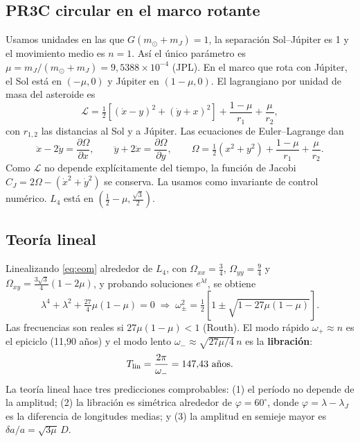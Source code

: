 \documentclass[11pt, a4paper]{article}
\newcommand{\Tlin}{T_{\rm lin}}
\begin{document}
\subsection{PR3C circular en el marco rotante}
Usamos unidades en las que $G(m_\odot+m_J)=1$, la separación Sol--Júpiter es 1 y el movimiento medio es $n=1$. Así el único parámetro es $\mu=m_J/(m_\odot+m_J)=9{,}5388\times10^{-4}$ (JPL). En el marco que rota con Júpiter, el Sol está en $(-\mu,0)$ y Júpiter en $(1-\mu,0)$. El lagrangiano por unidad de masa del asteroide es
\begin{equation}
\mathcal L=\tfrac12\left[(\dot x-y)^2+(\dot y+x)^2\right]+\frac{1-\mu}{r_1}+\frac{\mu}{r_2},
\end{equation}
con $r_{1,2}$ las distancias al Sol y a Júpiter. Las ecuaciones de Euler--Lagrange dan
\begin{equation}
\ddot x-2\dot y=\frac{\partial\Omega}{\partial x},\qquad \ddot y+2\dot x=\frac{\partial\Omega}{\partial y},\qquad
\Omega=\tfrac12(x^2+y^2)+\frac{1-\mu}{r_1}+\frac{\mu}{r_2}.
\label{eq:eom}
\end{equation}
Como $\mathcal L$ no depende explícitamente del tiempo, la función de Jacobi $C_J=2\Omega-(\dot x^2+\dot y^2)$ se conserva. La usamos como invariante de control numérico. $L_4$ está en $(\tfrac12-\mu,\tfrac{\sqrt3}{2})$.

\subsection{Teoría lineal}
Linealizando \eqref{eq:eom} alrededor de $L_4$, con $\Omega_{xx}=\tfrac34$, $\Omega_{yy}=\tfrac94$ y $\Omega_{xy}=\tfrac{3\sqrt3}{4}(1-2\mu)$, y probando soluciones $e^{\lambda t}$, se obtiene
\begin{equation}
\lambda^4+\lambda^2+\tfrac{27}{4}\mu(1-\mu)=0\;\Rightarrow\;
\omega_{\pm}^2=\tfrac12\left[1\pm\sqrt{1-27\mu(1-\mu)}\right].
\label{eq:car}
\end{equation}
Las frecuencias son reales si $27\mu(1-\mu)<1$ (Routh). El modo rápido $\omega_+\approx n$ es el epiciclo (11,90 años) y el modo lento $\omega_-\approx\sqrt{27\mu/4}\,n$ es la \textbf{libración}:
\begin{equation}
\Tlin=\frac{2\pi}{\omega_-}=147{,}43\ \text{años}.
\end{equation}
La teoría lineal hace tres predicciones comprobables: (1) el período no depende de la amplitud; (2) la libración es simétrica alrededor de $\varphi=60^\circ$, donde $\varphi=\lambda-\lambda_J$ es la diferencia de longitudes medias; y (3) la amplitud en semieje mayor es $\delta a/a=\sqrt{3\mu}\,D$.
\end{document}
